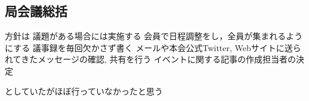 \subsection*{局会議総括}


方針は
    議題がある場合には実施する
    会員で日程調整をし，全員が集まれるようにする
    議事録を毎回欠かさず書く
    メールや本会公式Twitter, Webサイトに送られてきたメッセージの確認, 共有を行う
    イベントに関する記事の作成担当者の決定

としていたがほぼ行っていなかったと思う
